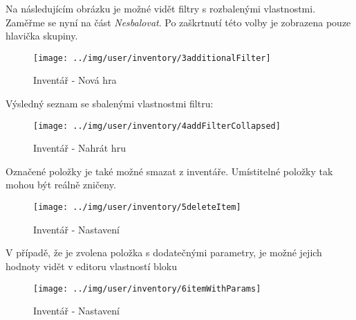 \FloatBarrier

Na následujícím obrázku je možné vidět filtry s rozbalenými vlastnostmi. Zaměřme se nyní na část \textit{Nesbalovat}. Po zaškrtnutí této volby je zobrazena pouze hlavička skupiny.

\begin{figure}[!ht]\centering
\texttt{[image: ../img/user/inventory/3additionalFilter]}

\caption{Inventář - Nová hra}
\label{fig:user_inventory_3additionalFilter}

\end{figure}

\FloatBarrier

Výsledný seznam se sbalenými vlastnostmi filtru:

\begin{figure}[!ht]\centering
\texttt{[image: ../img/user/inventory/4addFilterCollapsed]}

\caption{Inventář - Nahrát hru}
\label{fig:user_inventory_4addFilterCollapsed}

\end{figure}

\FloatBarrier

Označené položky je také možné smazat z inventáře. Umístitelné položky tak mohou být reálně zničeny. 

\begin{figure}[!ht]\centering
\texttt{[image: ../img/user/inventory/5deleteItem]}

\caption{Inventář - Nastavení}
\label{fig:user_inventory_5deleteItem}

\end{figure}

\FloatBarrier
V případě, že je zvolena položka s dodatečnými parametry, je možné jejich hodnoty vidět v editoru vlastností bloku

\begin{figure}[!ht]\centering
\texttt{[image: ../img/user/inventory/6itemWithParams]}

\caption{Inventář - Nastavení}
\label{fig:user_inventory_6itemWithParams}

\end{figure}


\FloatBarrier